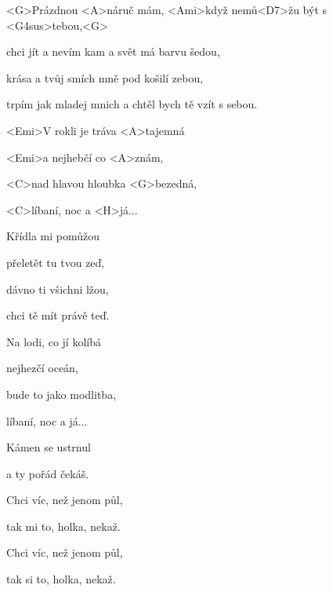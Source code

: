 

\zs
<G>Prázdnou <A>náruč mám, <Ami>když nemů<D7>žu být s <G4sus>tebou,<G>

chci jít a nevím kam a svět má barvu šedou,

krása a tvůj smích mně pod košilí zebou,

trpím jak mladej mnich a chtěl bych tě vzít s sebou.
\ks

\zr
<Emi>V rokli je tráva <A>tajemná

<Emi>a nejhebčí co <A>znám,

<C>nad hlavou hloubka <G>bezedná,

<C>líbaní, noc a <H>já...
\kr

\zs
Křídla mi pomůžou

přeletět tu tvou zeď,

dávno ti všichni lžou,

chci tě mít právě teď.

\ks

\zr
Na lodi, co jí kolíbá

nejhezčí oceán,

bude to jako modlitba,

líbaní, noc a já...
\kr

\zs
Kámen se ustrnul

a ty pořád čekáš.

Chci víc, než jenom půl,

tak mi to, holka, nekaž.

Chci víc, než jenom půl,

tak si to, holka, nekaž.

\ks

\kp
